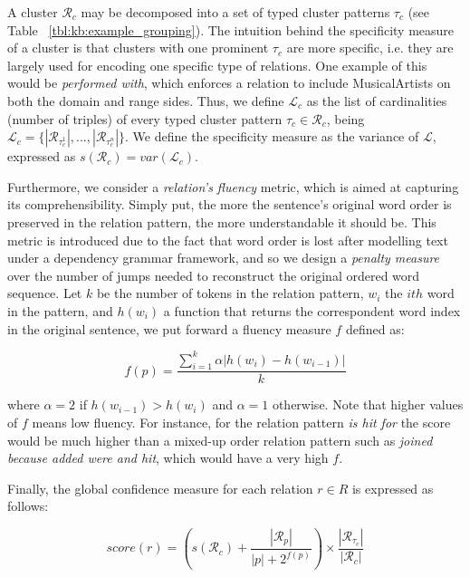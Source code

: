 A cluster $\mathcal{R}_c$ may be decomposed into a set of typed cluster patterns $\tau_c$ (see Table ~\ref{tbl:kb:example_grouping}). The intuition behind the specificity measure of a cluster is that clusters with one prominent $\tau_c$ are more specific, i.e. they are largely used for encoding one specific type of relations. One example of this would be \textit{performed with}, which enforces a relation to include MusicalArtists on both the domain and range sides. Thus, we define $\mathcal{L}_c$ as the list of cardinalities (number of triples) of every typed cluster pattern $\tau_c \in \mathcal{R}_c$, being $\mathcal{L}_c = \{|\mathcal{R}_{\tau_c^1}|,...,|\mathcal{R}_{\tau_c^n}|\}$. We define the specificity measure as the variance of $\mathcal{L}$, expressed as $s(\mathcal{R}_c) = var(\mathcal{L}_c)$.

Furthermore, we consider a \textit{relation's fluency} metric, which is aimed at capturing its comprehensibility. Simply put, the more the sentence's original word order is preserved in the relation pattern, the more understandable it should be. This metric is introduced due to the fact that word order is lost after modelling text under a dependency grammar framework, and so we design a \textit{penalty measure} over the number of jumps needed to reconstruct the original ordered word sequence. Let $k$ be the number of tokens in the relation pattern, $w_i$ the $ith$ word in the pattern, and $h(w_i)$ a function that returns the correspondent word index in the original sentence, we put forward a fluency measure $f$ defined as:

\begin{equation}
f(p) = \frac{\sum_{i=1}^{k} \alpha | h(w_i) - h(w_{i-1}) |}{k}
\end{equation}

where $\alpha=2$ if $h(w_{i-1}) > h(w_i)$ and $\alpha=1$ otherwise. Note that higher values of $f$ means low fluency. For instance, for the relation pattern \textit{is hit for} the score would be much higher than a mixed-up order relation pattern such as \textit{joined because added were and hit}, which would have a very high $f$.  

Finally, the global confidence measure for each relation $r \in R$ is expressed as follows:

\begin{equation}
score(r) = \left({s(\mathcal{R}_c) + \frac{|\mathcal{R}_p|}{|p|+2^{f(p)}}}\right) \times {\frac{|\mathcal{R}_{\tau_c}|}{|\mathcal{R}_c|}}
\end{equation}

